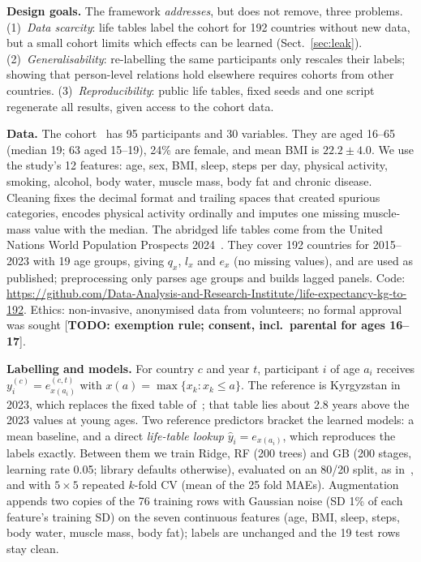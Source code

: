 \documentclass[runningheads]{llncs}
\begin{document}
\textbf{Design goals.} The framework \emph{addresses}, but does not remove, three problems.
(1)~\emph{Data scarcity}: life tables label the cohort for 192 countries without new data, but a
small cohort limits which effects can be learned (Sect.~\ref{sec:leak}).
(2)~\emph{Generalisability}: re-labelling the same participants only rescales their labels; showing
that person-level relations hold elsewhere requires cohorts from other countries.
(3)~\emph{Reproducibility}: public life tables, fixed seeds and one script regenerate all results,
given access to the cohort data.

\textbf{Data.} The cohort~\cite{bopushova2026} has 95 participants and 30 variables. They are aged
16--65 (median 19; 63 aged 15--19), 24\% are female, and mean BMI is $22.2\pm4.0$. We use the
study's 12 features: age, sex, BMI, sleep, steps per day, physical activity, smoking, alcohol, body
water, muscle mass, body fat and chronic disease. Cleaning fixes the decimal format and trailing
spaces that created spurious categories, encodes physical activity ordinally and imputes one
missing muscle-mass value with the median. The abridged life tables come from the United Nations
World Population Prospects 2024~\cite{wpp2024}. They cover 192 countries for 2015--2023 with 19 age
groups, giving $q_x$, $l_x$ and $e_x$ (no missing values), and are used as published;
preprocessing only parses age groups and builds lagged panels. Code: \url{https://github.com/Data-Analysis-and-Research-Institute/life-expectancy-kg-to-192}.
Ethics: non-invasive, anonymised data from volunteers; no formal approval was sought
[\textbf{TODO: exemption rule; consent, incl.\ parental for ages 16--17}].

\textbf{Labelling and models.} For country $c$ and year $t$, participant $i$ of age $a_i$
receives $y_i^{(c)} = e^{(c,t)}_{x(a_i)}$ with $x(a)=\max\{x_k : x_k\le a\}$. The reference is
Kyrgyzstan in 2023, which replaces the fixed table of~\cite{bopushova2026}; that table lies about
2.8 years above the 2023 values at young ages. Two reference predictors bracket the learned
models: a mean baseline, and a direct \emph{life-table lookup} $\hat y_i=e_{x(a_i)}$, which
reproduces the labels exactly. Between them we train Ridge, RF (200 trees) and GB (200 stages,
learning rate 0.05; library defaults otherwise), evaluated on an 80/20 split, as
in~\cite{bopushova2026}, and with $5\times5$ repeated $k$-fold CV (mean of the 25 fold MAEs).
Augmentation appends two copies of the 76 training rows with Gaussian noise (SD 1\% of each
feature's training SD) on the seven continuous features (age, BMI, sleep, steps, body water, muscle
mass, body fat); labels are unchanged and the 19 test rows stay clean.
\end{document}
